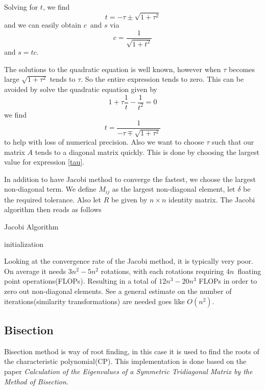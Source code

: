 \documentclass[%
reprint,
nofootinbib,
amsmath,amssymb,
aps,
]{revtex4-1}
\begin{document}
Solving for $t$, we find 
\begin{equation}
	t = -\tau \pm \sqrt{1+\tau^2}
\end{equation}
and we can easily obtain $c$ and $s$ via 
\begin{equation}
	c = \frac{1}{\sqrt{1 + t^2}}
\end{equation}
and $s = tc$. 

The solutions to the quadratic equation is well known, however when $\tau$ becomes large $\sqrt{1 + \tau^2}$ tends to $\tau$. So the entire expression tends to zero. This can be avoided by solve the quadratic equation given by 
\begin{equation}
	1 + \tau\frac{1}{t} - \frac{1}{t^2}= 0
\end{equation}
we find 
\begin{equation}\label{tau}
	t = \frac{1}{-\tau \mp \sqrt{1 + \tau^2}}
\end{equation}
to help with loss of numerical precision. Also we want to choose $\tau$ such that our matrix $A$ tends to a diagonal matrix quickly. This is done by choosing the largest value for expression \ref{tau}. 

In addition to have Jacobi method to converge the fastest, we choose the largest non-diagonal term\cite{GoluVanlJM}. 
We define $M_{ij}$ as the largest non-diagonal element, let $\delta$ be the required tolerance. Also let $R$ be given by $n\times n$ identity matrix.  
The Jacobi algorithm then reads as follows 
\begin{algorithm}[H]\label{algo:JM}
	\SetAlgoLined
	\caption{Jacobi Algorithm}
	initialization\;
\end{algorithm}

Looking at the convergence rate of the Jacobi method, it is typically very poor. On average it needs $3n^2 - 5n^2$ rotations, with each rotations requiring $4n$ floating point operations(FLOPs). Resulting in a total of $12n^3-20n^3$ FLOPs in order to zero out non-diagonal elements\cite{mortenJM}. See a general estimate on the number of iterations(similarity transformations) are needed goes like $O(n^2)$. 

\subsection{Bisection}\label{bi} %
Bisection method is way of root finding, in this case it is used to find the roots of the characteristic polynomial(CP). This implementation is done based on the paper \textit{Calculation of the Eigenvalues of a Symmetric Tridiagonal Matrix by the Method of Bisection}\cite{barth1967calculation}.
\end{document}
